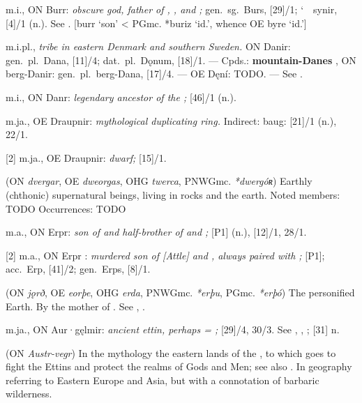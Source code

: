 \begin{itemize}
 m.i., ON Burr:
  \emph{obscure god, father of , , and ;} gen.~sg.~Burs, [29]/1; \char`~\ synir, [4]/1 (n.).  See .
  [burr ‘son’ < PGmc. *buriz ‘id.’, whence OE byre ‘id.’]

 m.i.pl.,
  \emph{tribe in eastern Denmark and southern Sweden.}
  ON Danir: gen.~pl.~Dana, [11]/4; dat.~pl.~Dǫnum, [18]/1. --- Cpds.: \textbf{mountain-Danes} , ON berg-Danir: gen.~pl.~berg-Dana, [17]/4. ---
  OE Dęní: TODO.
  --- See .

 m.i., ON Danr:
  \emph{legendary ancestor of the ;} [46]/1 (n.).

 m.ja., OE Draupnir:
  \emph{mythological duplicating ring.}  Indirect: baug: [21]/1 (n.), 22/1.

[2] m.ja., OE Draupnir:
  \emph{dwarf;} [15]/1.

 (ON \emph{dvergar}, OE \emph{dweorgas}, OHG \emph{twerca}, PNWGmc. \emph{*dwergóʀ})
  Earthly (chthonic) supernatural beings, living in rocks and the earth.
  Noted members: TODO
  Occurrences: TODO

 m.a., ON Erpr:
  \emph{son of  and half-brother of  and ;} [P1] (n.), [12]/1, 28/1.

[2] m.a., ON Erpr :
  \emph{murdered son of [Attle] and , always paired with ;} [P1]; acc.~Erp, [41]/2; gen.~Erps, [8]/1.

 (ON \emph{jǫrð}, OE \emph{eorþe}, OHG \emph{erda}, PNWGmc. \emph{*erþu}, PGmc. \emph{*erþó})
  The personified Earth.  By  the mother of .  See , .

 m.ja., ON Aur·gęlmir:
  \emph{ancient ettin, perhaps = ;} [29]/4, 30/3.  See , , ; [31] n.

 (ON \emph{Austr-vegr})
  In the mythology the eastern lands of the , to which  goes to fight the Ettins and protect the realms of Gods and Men; see also .  In geography referring to Eastern Europe and Asia, but with a connotation of barbaric wilderness.


\end{itemize}
